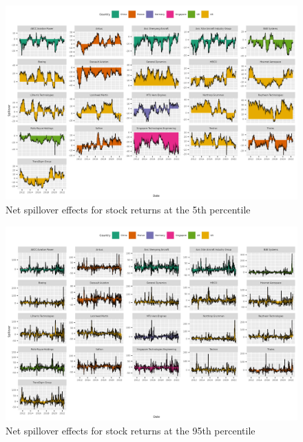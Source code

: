 \documentclass[
  number]{elsarticle}
\begin{document}
\begin{figure}[H]

{\centering \includegraphics{plots/fig-rtnnet5.png}

}

\caption{\label{fig-rtnet5}Net spillover effects for stock returns at
the 5th percentile}

\end{figure}

\begin{figure}[H]

{\centering \includegraphics{plots/fig-rtnnet95.png}

}

\caption{\label{fig-rtnet95}Net spillover effects for stock returns at
the 95th percentile}

\end{figure}
\end{document}
